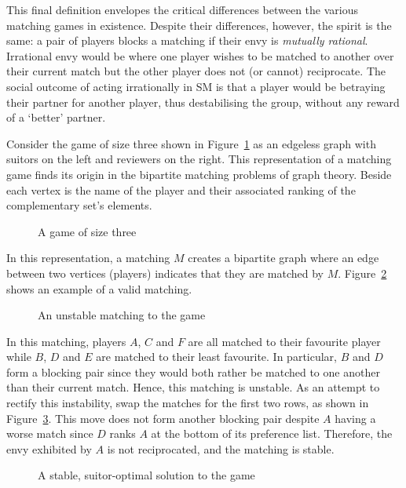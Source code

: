 This final definition envelopes the critical differences between the various
matching games in existence. Despite their differences, however, the spirit is
the same: a pair of players blocks a matching if their envy is \emph{mutually
rational}. Irrational envy would be where one player wishes to be matched to
another over their current match but the other player does not (or cannot)
reciprocate. The social outcome of acting irrationally in SM is that a player
would be betraying their partner for another player, thus destabilising the
group, without any reward of a `better' partner.

Consider the game of size three shown in Figure~\ref{fig:sm_matching} as an
edgeless graph with suitors on the left and reviewers on the right. This
representation of a matching game finds its origin in the bipartite matching
problems of graph theory. Beside each vertex is the name of the player and their
associated ranking of the complementary set’s elements.

\begin{figure}[htbp]
    \centering
    
    \caption{A game of size three}\label{fig:sm_matching}
\end{figure}

In this representation, a matching \(M\) creates a bipartite graph where an edge
between two vertices (players) indicates that they are matched by \(M\).
Figure~\ref{fig:sm_unstable} shows an example of a valid matching.

\begin{figure}[htbp]
    \centering
    
    \caption{An unstable matching to the game}\label{fig:sm_unstable}
\end{figure}

In this matching, players \(A\), \(C\) and \(F\) are all matched to their
favourite player while \(B\), \(D\) and \(E\) are matched to their least
favourite. In particular, \(B\) and \(D\) form a blocking pair since they would
both rather be matched to one another than their current match. Hence, this
matching is unstable. As an attempt to rectify this instability, swap the
matches for the first two rows, as shown in Figure~\ref{fig:sm_stable}. This
move does not form another blocking pair despite \(A\) having a worse match
since \(D\) ranks \(A\) at the bottom of its preference list. Therefore, the
envy exhibited by \(A\) is not reciprocated, and the matching is stable.

\begin{figure}[htbp]
    \centering
    
    \caption{A stable, suitor-optimal solution to the game}\label{fig:sm_stable}
\end{figure}

